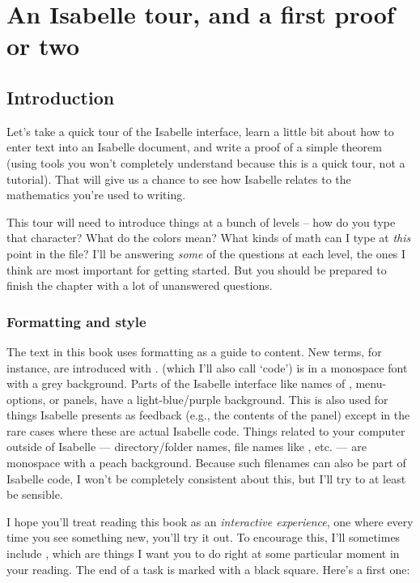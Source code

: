 \chapter{An Isabelle tour, and a first proof or two}


\section{Introduction}
Let's take a quick tour of the Isabelle interface, learn a little bit about how to enter text into an Isabelle document, and write a proof of a simple theorem (using tools you won't completely understand because this is a quick tour, not a tutorial). That will give us a chance to see how Isabelle relates to the mathematics you're used to writing. 

This tour will need to introduce things at a bunch of levels -- how do you type that character? What do the colors mean? What kinds of math can I type at \textit{this} point in the file? I'll be answering \textit{some} of the questions at each level, the ones I think are most important for getting started. But you should be prepared to finish the chapter with a lot of unanswered questions.

\subsection{Formatting and style}
The text in this book uses formatting as a guide to content. New terms, for instance, are introduced with .  (which I'll also call `code') is in a monospace font with a grey background. Parts of the Isabelle interface like names of , menu-options, or panels, have a light-blue/purple background. This is also used for things Isabelle presents as feedback (e.g., the contents of the  panel) except in the rare cases where these are actual Isabelle code. Things related to your computer outside of Isabelle --- directory/folder names, file names like , etc. --- are monospace with a peach background. Because such filenames can also be part of Isabelle code, I won't be completely consistent about this, but I'll try to at least be sensible.

I hope you'll treat reading this book as an \emph{interactive experience}, one where every time you see something new, you'll try it out. To encourage this, I'll sometimes include , which are things I want you to do right at some particular moment in your reading. The end of a task is marked with a black square. Here's a first one:

